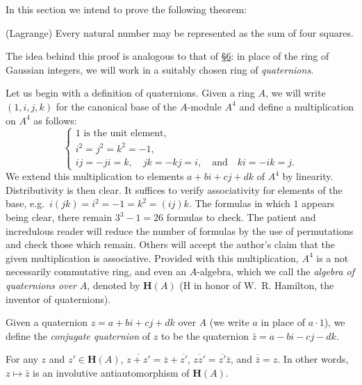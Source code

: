 
In this section we intend to prove the following theorem:

\begin{theorem}
\label{thm:V.7.1}
(Lagrange) Every natural number may be represented as the sum of four
squares.
\end{theorem}

The idea behind this proof is analogous to that of \hyperref[sec:5.6]{§6}: in place of the ring
of Gaussian integers, we will work in a suitably chosen ring of
\emph{quaternions}.

Let us begin with a definition of quaternions. Given a ring $A$, we will
write $(1,i,j,k)$ for the canonical base of the $A$-module $A^{4}$ and
define a multiplication on $A^{4}$ as follows:
\begin{equation}
\left\{
\begin{array}{l}
1 \text{ is the unit element,}\\
i^{2}=j^{2}=k^{2}=-1,\\
ij=-ji=k,\quad jk=-kj=i,\quad\text{and}\quad ki=-ik=j.
\end{array}
\right.
\label{eq:V.7.1}
\end{equation}
We extend this multiplication to elements $a+bi+cj+dk$ of $A^{4}$ by
linearity. Distributivity is then clear. It suffices to verify associativity
for elements of the base, e.g.\ $i(jk)=i^{2}=-1=k^{2}=(ij)k$. The formulas
in which $1$ appears being clear, there remain $3^{3}-1=26$ formulas to
check. The patient and incredulous reader will reduce the number of formulas
by the use of permutations and check those which remain. Others will accept
the author's claim that the given multiplication is associative. Provided
with this multiplication, $A^{4}$ is a not necessarily commutative ring, and
even an $A$-algebra, which we call the \emph{algebra of quaternions over}
$A$, denoted by $\mathbf{H}(A)$ (H in honor of W.~R. Hamilton, the inventor
of quaternions).

Given a quaternion $z=a+bi+cj+dk$ over $A$ (we write $a$ in place of
$a\cdot1$), we define the \emph{conjugate quaternion} of $z$ to be the
quaternion $\bar z=a-bi-cj-dk$.

\begin{lemma}
\label{lem:V.7.1}
For any $z$ and $z'\in\mathbf{H}(A)$,
$\overline{z+z'}=\bar z+\overline{z'}$,
$\overline{zz'}=\overline{z'}\bar z$, and $\overline{\bar z}=z$. In other
words, $z\mapsto\bar z$ is an involutive antiautomorphism of
$\mathbf{H}(A)$.
\end{lemma}

